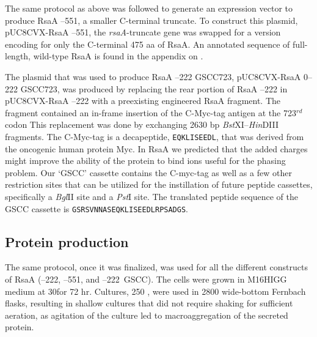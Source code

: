 The same protocol as above was followed to generate an expression vector to produce RsaA --551, a smaller C-terminal truncate. To construct this plasmid, pUC8CVX-RsaA --551, the \textit{rsaA}-truncate gene was swapped for a version encoding for only the C-terminal 475 \ac{aa} of RsaA. An annotated sequence of full-length, wild-type RsaA is found in the appendix on .

The plasmid that was used to produce RsaA --222 GSCC723, pUC8CVX-RsaA
\del{}0--222 GSCC723, was produced by replacing the rear portion of RsaA --222 in pUC8CVX-RsaA --222 with a preexisting engineered RsaA fragment.
The fragment contained an in-frame insertion of the C-Myc-tag antigen at the
723$^{rd}$ codon This replacement was done by
exchanging 2630 bp \textit{Bst}XI--\textit{Hin}DIII fragments. The C-Myc-tag is
a decapeptide, \texttt{EQKLISEEDL}, that was derived from the oncogenic human
protein Myc. In RsaA we predicted that the added charges might improve the
ability of the protein to bind  ions useful for the phasing problem. Our `GSCC' cassette contains the C-myc-tag as well as a few other restriction sites that can be utilized for the instillation of future peptide cassettes, specifically a \textit{Bgl}II site and a \textit{Pst}I site. The translated peptide sequence of the GSCC cassette is \texttt{GSRSVNNASEQKLISEEDLRPSADGS}. 

\subsection{Protein production}
\label{sub:crystal-protein-production}

The same protocol, once it was finalized, was used for all the different constructs of RsaA (--222, --551, and --222~GSCC).
The cells were grown in M16HIGG medium
at 30\cel for 72 hr. Cultures, 250 \millilitre,
were used in 2800 \millilitre wide-bottom Fernbach flasks, resulting in shallow
cultures that did not require shaking for sufficient aeration, as
agitation of the culture led to macroaggregation of the secreted
protein. 

